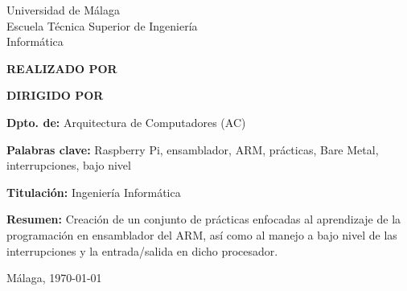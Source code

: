 
\thispagestyle{empty}
\begin{center}
  \Large \sffamily
  Universidad de Málaga\\
  Escuela Técnica Superior de Ingeniería \\
  Informática
\end{center}

\bigskip

\begin{center}
  \Huge\scshape
  \pfctitlename
\end{center}

\bigskip

\begin{center}
  \textbf{REALIZADO POR}\\
  \textsf{\pfcauthorname}
\end{center}

\medskip

\begin{center}
  \textbf{DIRIGIDO POR}\\
  \textsf{\pfctutorname}
\end{center}

\vfill

\begin{minipage}{\textwidth}
\textbf{Dpto. de:} Arquitectura de Computadores (AC)

\medskip

\textbf{Palabras clave:} Raspberry Pi, ensamblador, ARM, prácticas, Bare Metal, interrupciones, bajo nivel

\medskip

\textbf{Titulación:} Ingeniería Informática

\medskip

\textbf{Resumen:}
  Creación de un conjunto de prácticas enfocadas al aprendizaje de la programación en
  ensamblador del ARM, así como al manejo a bajo nivel de las interrupciones y la
  entrada/salida en dicho procesador.

\begin{center} Málaga, \today\end{center}
\end{minipage}

\blankpage
